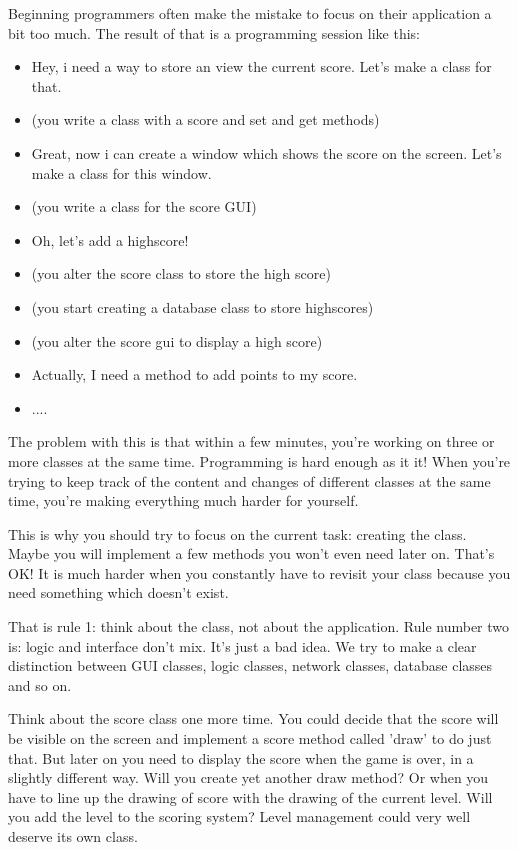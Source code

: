 Beginning programmers often make the mistake to focus on their application a bit too much. The result of that is a programming session like this:

\begin{itemize}
  \item Hey, i need a way to store an view the current score. Let's make a class for that.
  \item (you write a class with a score and set and get methods)
  \item Great, now i can create a window which shows the score on the screen. Let's make a class for this window.
  \item (you write a class for the score GUI)
  \item Oh, let's add a highscore!
  \item (you alter the score class to store the high score)
  \item (you start creating a database class to store highscores)
  \item (you alter the score gui to display a high score)
  \item Actually, I need a method to add points to my score.
  \item ....
\end{itemize}

The problem with this is that within a few minutes, you're working on three or more classes at the same time. Programming is hard enough as it it! When you're trying to keep track of the content and changes of different classes at the same time, you're making everything much harder for yourself.

This is why you should try to focus on the current task: creating the class. Maybe you will implement a few methods you won't even need later on. That's OK! It is much harder when you constantly have to revisit your class because you need something which doesn't exist.

That is rule 1: think about the class, not about the application. Rule number two is: logic and interface don't mix. It's just a bad idea. We try to make a clear distinction between GUI classes, logic classes, network classes, database classes and so on.

Think about the score class one more time. You could decide that the score will be visible on the screen and implement a score method called 'draw' to do just that. But later on you need to display the score when the game is over, in a slightly different way. Will you create yet another draw method? Or when you have to line up the drawing of score with the drawing of the current level. Will you add the level to the scoring system? Level management could very well deserve its own class.

